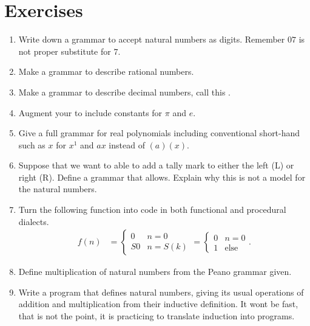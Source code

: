 \section*{Exercises}

\begin{enumerate}
    \item Write down a grammar to accept natural numbers as digits.  Remember $07$ is not proper substitute for $7$.
    \item Make a grammar to describe rational numbers.
    \item Make a grammar to describe decimal numbers, call this .  
    \item Augment your  to include constants for $\pi$ and $e$.
    \item Give a full grammar for real polynomials including conventional short-hand 
    such as $x$ for $x^1$ and $ax$ instead of $(a)(x)$.
    
    \item Suppose that we want to able to add a tally mark to either the left (L) or right (R).
    Define a grammar that allows.  Explain why this is not a model for the natural numbers.
        
    \item Turn the following function into code in both functional and procedural dialects.
    \begin{align*}
        f(n) & = \begin{cases}
                    0 & n=0\\
                    S0 & n=S(k)
        \end{cases}
         =\begin{cases} 0 & n=0 \\ 1 & \text{else}\end{cases}.
    \end{align*}
    
    \item Define multiplication of natural numbers from the Peano grammar given.
    
    \item Write a program that defines natural numbers, giving its usual operations of addition 
    and multiplication from their inductive definition.  It wont be fast, that is not the point,
    it is practicing to translate induction into programs.
\end{enumerate}